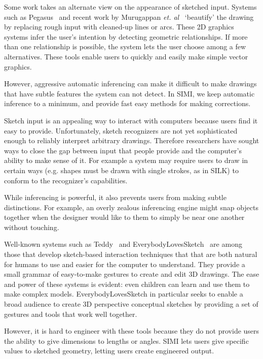 \documentclass{article}
\begin{document}
Some work takes an alternate view on the appearance of sketched
input. Systems such as Pegasus~\cite{igarashi-pegasus} and recent work
by Murugappan \textit{et. al}~\cite{murugappan-beautification}
`beautify' the drawing by replacing rough input with cleaned-up lines
or arcs. These 2D graphics systems infer the user's intention by
detecting geometric relationships. If more than one relationship is
possible, the system lets the user choose among a few
alternatives. These tools enable users to quickly and easily make
simple vector graphics. 

However, aggressive automatic inferencing can make it difficult to
make drawings that have subtle features the system can not detect. In
SIMI, we keep automatic inference to a minimum, and provide fast easy
methods for making corrections.

Sketch input is an appealing way to interact with computers because
users find it easy to provide. Unfortunately, sketch recognizers are
not yet sophisticated enough to reliably interpret arbitrary
drawings. Therefore researchers have sought ways to close the gap
between input that people provide and the computer's ability to make
sense of it. For example a system may require users to draw in certain
ways (e.g. shapes must be drawn with single strokes, as in SILK) to
conform to the recognizer's capabilities.

While inferencing is powerful, it also prevents users from making
subtle distinctions. For example, an overly zealous inferencing engine
might snap objects together when the designer would like to them to
simply be near one another without touching. 

Well-known systems such as Teddy~\cite{igarashi-teddy} and
EverybodyLovesSketch~\cite{bae-everybody} are among those that develop
sketch-based interaction techniques that that are both natural for
humans to use and easier for the computer to understand.  They provide
a small grammar of easy-to-make gestures to create and edit 3D
drawings. The ease and power of these systems is evident: even
children can learn and use them to make complex
models. EverybodyLovesSketch in particular seeks to enable a broad
audience to create 3D perspective conceptual sketches by providing a
set of gestures and tools that work well together. 

However, it is hard to engineer with these tools because they do not
provide users the ability to give dimensions to lengths or
angles. SIMI lets users give specific values to sketched geometry,
letting users create engineered output.
\end{document}
